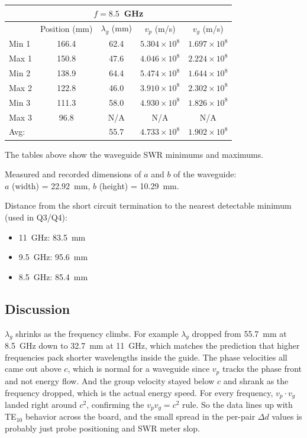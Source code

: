 \documentclass[11pt,letterpaper]{article}
\begin{document}
\begin{center}
\begin{tabular}{lcccc}
\toprule
\multicolumn{5}{c}{\textbf{$f = 8.5$~GHz}} \\
\midrule
 & Position (mm) & $\lambda_g$ (mm) & $v_p$ (m/s) & $v_g$ (m/s) \\
\midrule
Min 1     & 166.4 & 62.4 & $5.304\times10^{8}$ & $1.697\times10^{8}$ \\
Max 1     & 150.8 & 47.6 & $4.046\times10^{8}$ & $2.224\times10^{8}$ \\
Min 2     & 138.9 & 64.4 & $5.474\times10^{8}$ & $1.644\times10^{8}$ \\
Max 2     & 122.8 & 46.0 & $3.910\times10^{8}$ & $2.302\times10^{8}$ \\
Min 3     & 111.3 & 58.0 & $4.930\times10^{8}$ & $1.826\times10^{8}$ \\
Max 3     & 96.8  & N/A  & N/A                 & N/A                 \\
\midrule
Avg:      &       & 55.7 & $4.733\times10^{8}$ & $1.902\times10^{8}$ \\
\bottomrule
\end{tabular}
\end{center}

The tables above show the waveguide SWR minimums and maximums.

Measured and recorded dimensions of $a$ and $b$ of the waveguide:\\
$a$ (width) = 22.92~mm, $b$ (height) = 10.29~mm.

Distance from the short circuit termination to the nearest detectable minimum (used in Q3/Q4):
\begin{itemize}[leftmargin=*]
  \item 11~GHz: 83.5~mm
  \item 9.5~GHz: 95.6~mm
  \item 8.5~GHz: 85.4~mm
\end{itemize}

\subsection*{Discussion}

$\lambda_g$ shrinks as the frequency climbs. For example $\lambda_g$ dropped from 55.7~mm at 8.5~GHz down to 32.7~mm at 11~GHz, which matches the prediction that higher frequencies pack shorter wavelengths inside the guide. The phase velocities all came out above $c$, which is normal for a waveguide since $v_p$ tracks the phase front and not energy flow. And the group velocity stayed below $c$ and shrank as the frequency dropped, which is the actual energy speed. For every frequency, $v_p \cdot v_g$ landed right around $c^2$, confirming the $v_p v_g = c^2$ rule. So the data lines up with TE$_{10}$ behavior across the board, and the small spread in the per-pair $\Delta d$ values is probably just probe positioning and SWR meter slop.
\end{document}

